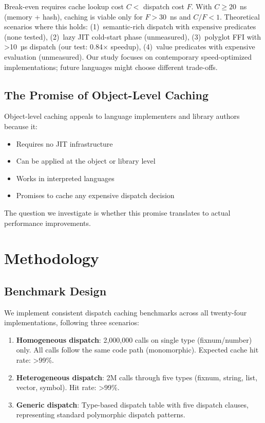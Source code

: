 \documentclass[sigplan,final,acmsmall,review,screen]{acmart}
\begin{document}
Break-even requires cache lookup cost $C < $ dispatch cost $F$. With $C \geq 20$~ns (memory + hash), caching is viable only for $F > 30$~ns and $C/F < 1$. Theoretical scenarios where this holds: (1)~semantic-rich dispatch with expensive predicates (none tested), (2)~lazy JIT cold-start phase (unmeasured), (3)~polyglot FFI with >10~µs dispatch (our test: 0.84× speedup), (4)~value predicates with expensive evaluation (unmeasured). Our study focuses on contemporary speed-optimized implementations; future languages might choose different trade-offs.

\subsection{The Promise of Object-Level Caching}

Object-level caching appeals to language implementers and library authors because it:
\begin{itemize}
  \item Requires no JIT infrastructure
  \item Can be applied at the object or library level
  \item Works in interpreted languages
  \item Promises to cache any expensive dispatch decision
\end{itemize}

The question we investigate is whether this promise translates to actual performance improvements.

\section{Methodology}

\subsection{Benchmark Design}

We implement consistent dispatch caching benchmarks across all twenty-four implementations, following
three scenarios:

\begin{enumerate}
  \item \textbf{Homogeneous dispatch}: 2,000,000 calls on single type (fixnum/number) only.
    All calls follow the same code path (monomorphic). Expected cache hit rate: >99\%.

  \item \textbf{Heterogeneous dispatch}: 2M calls through five types
    (fixnum, string, list, vector, symbol). Hit rate: >99\%.

  \item \textbf{Generic dispatch}: Type-based dispatch table with five dispatch clauses,
    representing standard polymorphic dispatch patterns.
\end{enumerate}
\end{document}

